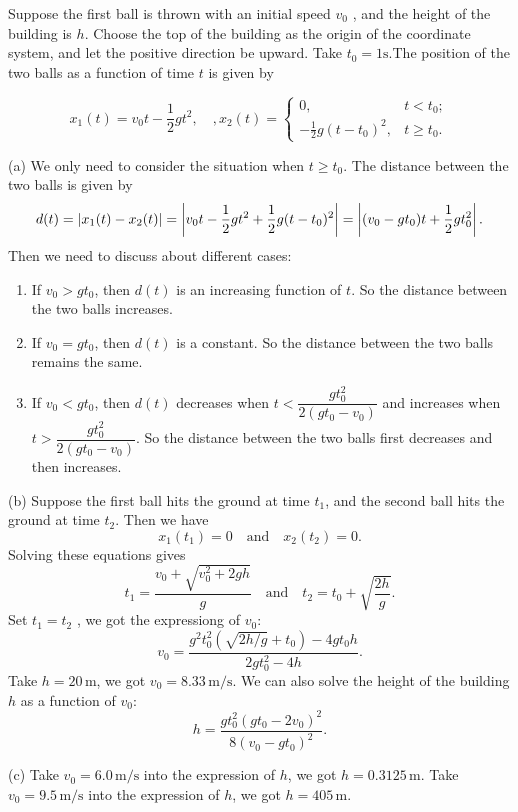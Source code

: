 \documentclass{article}
\begin{document}
\begin{solution}
Suppose the first ball is thrown with an initial speed \(v_0\) , and the height of the building is \(h\). Choose the top of the building as the origin of the coordinate system, and let the positive direction be upward. Take $ t_0=1\mathrm{s}. $The position of the two balls as a function of time \(t\) is given by

\[ x_1(t)=v_0t-\frac{1}{2}gt^2,\quad, x_2(t)=
\begin{cases}
0, & t<t_0;\\
-\frac{1}{2}g(t-t_0)^2, & t\geq t_0.
\end{cases}\] 

(a) We only need to consider the situation when \(t\geq t_0\). The distance between the two balls is given by
\[ d(t)=\left|x_1(t)-x_2(t)\right|=\left|v_0t-\frac{1}{2}gt^2+\frac{1}{2}g(t-t_0)^2\right|=\left|(v_0-gt_0)t+\frac{1}{2}gt_0^2\right|.\]
Then we need to discuss about different cases:
\begin{enumerate}[label=(\roman*)]
    \item If \(v_0>gt_0\), then \(d(t)\) is an increasing function of \(t\). So the distance between the two balls increases.
    \item If \(v_0=gt_0\), then \(d(t)\) is a constant. So the distance between the two balls remains the same.
    \item If \(v_0<gt_0\), then \(d(t)\) decreases when \(t<\dfrac{gt_0^2}{2(gt_0-v_0)}\) and increases when \(t>\dfrac{gt_0^2}{2(gt_0-v_0)}\). So the distance between the two balls first decreases and then increases.
\end{enumerate}

(b) Suppose the first ball hits the ground at time \(t_1\), and the second ball hits the ground at time \(t_2\). Then we have
\[ x_1(t_1) = 0 \quad \text{and} \quad x_2(t_2) = 0. \]
Solving these equations gives
\[ t_1 = \frac{v_0 + \sqrt{v_0^2 + 2gh}}{g} \quad \text{and} \quad t_2 = t_0 + \sqrt{\frac{2h}{g}}. \]
Set \(t_1 = t_2\) , we got the expressiong of $ v_0 $:
\[ v_0=\frac{g^2 t_0^2 \left(\sqrt{2h/g}+t_0\right)-4 g t_0h}{2 g t_0^2-4 h}. \]
Take $ h=20\,\mathrm{m} $, we got $ \boxed{v_0=8.33\,\mathrm{m/s}} $.
We can also solve the height of the building \(h\) as a function of \(v_0\):
\[ \boxed{h=\frac{g t_0^2 (g t_0-2 v_0)^2}{8 (v_0-g t_0)^2}}. \] \par 

(c) Take \(v_0 = 6.0\,\text{m}/\text{s}\) into the expression of \(h\), we got $ \boxed{h=0.3125\,\mathrm{m}} $. Take \(v_0 = 9.5\,\text{m}/\text{s}\) into the expression of \(h\), we got $ \boxed{h=405\,\mathrm{m}} $.\par 


\end{solution}
\end{document}
